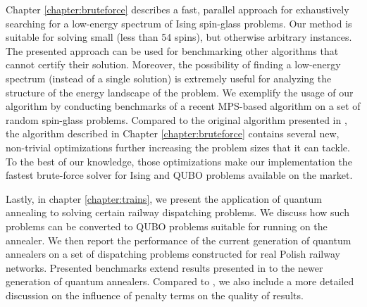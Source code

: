 Chapter \ref{chapter:bruteforce} describes a fast, parallel approach for
exhaustively searching for a low-energy spectrum of Ising spin-glass problems.
Our method is suitable for solving small (less than 54 spins), but otherwise
arbitrary instances. The presented approach can be used for benchmarking other
algorithms that cannot certify their solution. Moreover, the possibility of
finding a low-energy spectrum (instead of a single solution) is extremely
useful for analyzing the structure of the energy landscape of the problem. We
exemplify the usage of our algorithm by conducting benchmarks of a recent
MPS-based algorithm on a set of random spin-glass problems. Compared to the
original algorithm presented in \cite{bruteforce}, the algorithm described in
Chapter \ref{chapter:bruteforce} contains several new, non-trivial
optimizations further increasing the problem sizes that it can tackle.
To the best of our knowledge, those optimizations make our implementation the
fastest brute-force solver for Ising and QUBO problems available on the market.

Lastly, in chapter \ref{chapter:trains}, we present the application of quantum
annealing to solving certain railway dispatching problems. We discuss how such
problems can be converted to QUBO problems suitable for running on the
annealer. We then report the performance of the current generation of quantum
annealers on a set of dispatching problems constructed for real Polish railway
networks. Presented benchmarks extend results presented in
\cite{railwaydispatching} to the newer generation of quantum annealers.
Compared to \cite{railwaydispatching}, we also include a more detailed
discussion on the influence of penalty terms on the quality of results.
